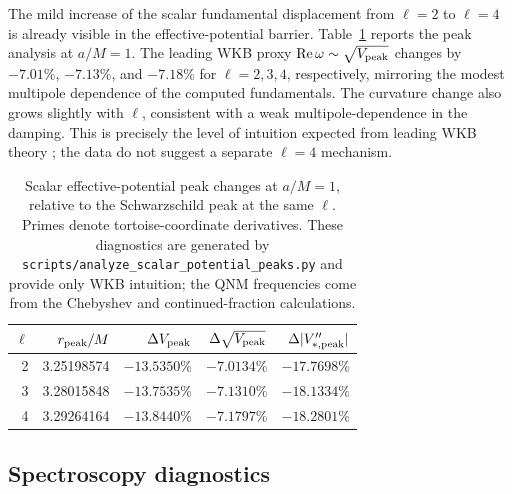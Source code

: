 \documentclass[12pt,a4paper]{article}
\begin{document}
The mild increase of the scalar fundamental displacement from \(\ell=2\) to
\(\ell=4\) is already visible in the effective-potential barrier.
Table~\ref{tab:potentialpeaks} reports the peak analysis
at \(a/M=1\).  The leading WKB proxy
\(\operatorname{Re}\omega\sim\sqrt{V_{\rm peak}}\) changes by \(-7.01\%\),
\(-7.13\%\), and \(-7.18\%\) for \(\ell=2,3,4\), respectively, mirroring the
modest multipole dependence of the computed fundamentals.  The curvature
change also grows slightly with \(\ell\), consistent with a weak
multipole-dependence in the damping. This is precisely the level of intuition
expected from leading WKB theory \cite{Ferrari1984,Konoplya2003}; the data do
not suggest a separate \(\ell=4\) mechanism.

\begin{table}[H]
\centering
\footnotesize
\begin{tabular}{rrrrr}
\toprule
\(\ell\) & \(r_{\rm peak}/M\) & \(\Delta V_{\rm peak}\) &
\(\Delta\sqrt{V_{\rm peak}}\) & \(\Delta|V''_{*,\rm peak}|\)\\
\midrule
2 & 3.25198574 & \(-13.5350\%\) & \(-7.0134\%\) & \(-17.7698\%\)\\
3 & 3.28015848 & \(-13.7535\%\) & \(-7.1310\%\) & \(-18.1334\%\)\\
4 & 3.29264164 & \(-13.8440\%\) & \(-7.1797\%\) & \(-18.2801\%\)\\
\bottomrule
\end{tabular}
\caption{Scalar effective-potential peak changes at \(a/M=1\), relative to
the Schwarzschild peak at the same \(\ell\).  Primes denote tortoise-coordinate
derivatives.  These diagnostics are generated by
\texttt{scripts/analyze\_scalar\_potential\_peaks.py} and provide only WKB
intuition; the QNM frequencies come from the Chebyshev and continued-fraction
calculations.}
\label{tab:potentialpeaks}
\end{table}

\subsection{Spectroscopy diagnostics}
\end{document}
